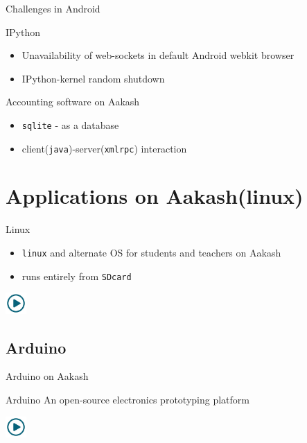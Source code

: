 \documentclass{beamer}
\begin{document}
  \begin{frame}{Challenges in Android}
    \begin{block}{IPython}
      \begin{itemize}
        \item Unavailability of web-sockets in default Android webkit
          browser
        \item IPython-kernel random shutdown
      \end{itemize}
    \end{block}
    \begin{block}{Accounting software on Aakash}
      \begin{itemize}
        \item {\tt sqlite} - as a database 
        \item client({\tt java})-server({\tt xmlrpc}) interaction
      \end{itemize}
    \end{block}
  \end{frame}
\section{Applications on Aakash(linux)}
\begin{frame}{Linux}
  \begin{block}{}
    \begin{itemize}
    \item {\tt linux} and alternate OS for students and teachers on
      Aakash
    \item runs entirely from {\tt SDcard}
    \end{itemize}
  \end{block}
  \centerline{\href{file:///home/sachin/github/slides/scipy2012/linux.3gp}{\includegraphics[height=0.8cm,width=0.8cm]{play.jpg}}}
\end{frame}

\subsection{Arduino}
\begin{frame}{Arduino on Aakash}
  \begin{block}{Arduino}
    An open-source electronics prototyping platform
  \end{block}
  \centerline{\href{file:///home/sachin/github/slides/scipy2012/arduino.3gp}{\includegraphics[height=0.8cm,width=0.8cm]{play.jpg}}}
\end{frame}
\end{document}
